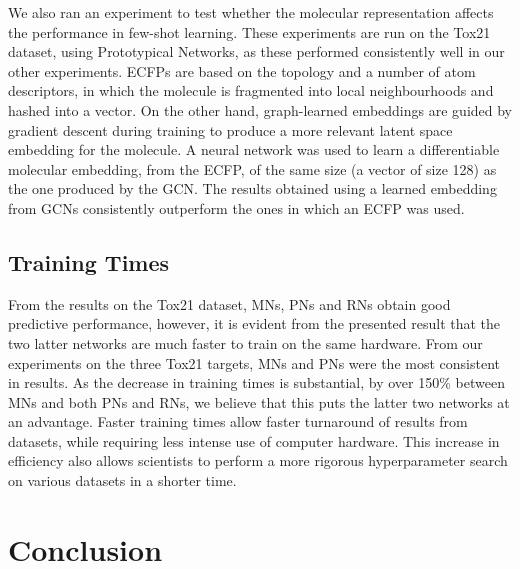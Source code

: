 \documentclass[journal=acscii,manuscript=article]{achemso}
\begin{document}
We also ran an experiment to test whether the molecular representation affects the performance in few-shot learning. These experiments are run on the Tox21 dataset, using Prototypical Networks, as these performed consistently well in our other experiments. ECFPs are based on the topology and a number of atom descriptors, in which the molecule is fragmented into local neighbourhoods and hashed into a vector. On the other hand, graph-learned embeddings are guided by gradient descent during training to produce a more relevant latent space embedding for the molecule. A neural network was used to learn a differentiable molecular embedding, from the ECFP, of the same size (a vector of size 128) as the one produced by the GCN. The results obtained using a learned embedding from GCNs consistently outperform the ones in which an ECFP was used.

\subsection{Training Times}

From the results on the Tox21 dataset, MNs, PNs and RNs obtain good predictive performance, however, it is evident from the presented result that the two latter networks are much faster to train on the same hardware. From our experiments on the three Tox21 targets, MNs and PNs were the most consistent in results. As the decrease in training times is substantial, by over 150\% between MNs and both PNs and RNs, we believe that this puts the latter two networks at an advantage. Faster training times allow faster turnaround of results from datasets, while requiring less intense use of computer hardware. This increase in efficiency also allows scientists to perform a more rigorous hyperparameter search on various datasets in a shorter time.

\section{Conclusion}
\end{document}
